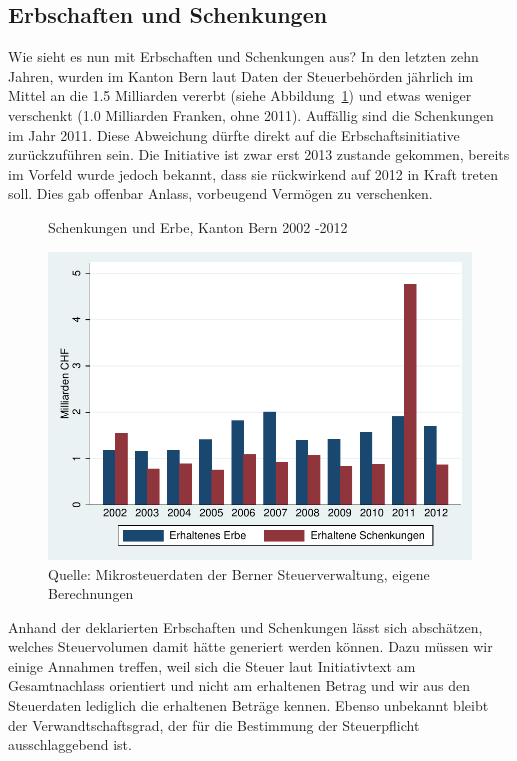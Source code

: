 \documentclass[a4paper, 12pt,liststotoc]{scrartcl}
\numberwithin{equation}{section}
\begin{document}
\subsection{ Erbschaften und Schenkungen
    }\label{erbschaften-und-schenkungen}

Wie sieht es nun mit Erbschaften und Schenkungen aus? In den letzten
zehn Jahren, wurden im Kanton Bern laut Daten der Steuerbehörden
jährlich im Mittel an die 1.5 Milliarden vererbt (siehe Abbildung~\ref{fig:schenkungen_und_erbe}) und etwas weniger
verschenkt (1.0 Milliarden Franken, ohne 2011). Auffällig sind die
Schenkungen im Jahr 2011. Diese Abweichung dürfte direkt auf die
Erbschaftsinitiative zurückzuführen sein. Die Initiative ist zwar erst
2013 zustande gekommen, bereits im Vorfeld wurde jedoch bekannt, dass
sie rückwirkend auf 2012 in Kraft treten soll. Dies gab offenbar Anlass,
vorbeugend Vermögen zu verschenken.

\begin{figure}[!ht]
  \caption{Schenkungen und Erbe, Kanton Bern 2002 -2012}
  \label{fig:schenkungen_und_erbe}
  \centering
    \includegraphics[width=\textwidth]{figure/ErbeSchenkungen}
  \caption*{Quelle: Mikrosteuerdaten der Berner Steuerverwaltung, eigene Berechnungen}
\end{figure}

Anhand der deklarierten Erbschaften und Schenkungen lässt sich
abschätzen, welches Steuervolumen damit hätte generiert werden können.
Dazu müssen wir einige Annahmen treffen, weil sich die Steuer laut
Initiativtext am Gesamtnachlass orientiert und nicht am erhaltenen
Betrag und wir aus den Steuerdaten lediglich die erhaltenen Beträge
kennen. Ebenso unbekannt bleibt der Verwandtschaftsgrad, der für die
Bestimmung der Steuerpflicht ausschlaggebend ist.
\end{document}
